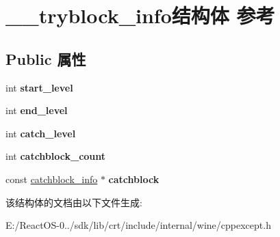\hypertarget{struct____tryblock__info}{}\section{\+\_\+\+\_\+tryblock\+\_\+info结构体 参考}
\label{struct____tryblock__info}
\subsection*{Public 属性}
\begin{DoxyCompactItemize}
\item 
\mbox{\label{struct____tryblock__info_a83c4d072d83211feb322e2071b5962cf}} 
int {\bfseries start\+\_\+level}
\item 
\mbox{\label{struct____tryblock__info_a9a10f00b8deae949d2c90fd0f63cc679}} 
int {\bfseries end\+\_\+level}
\item 
\mbox{\label{struct____tryblock__info_aeb014984d06e8577f6620a59be25ab47}} 
int {\bfseries catch\+\_\+level}
\item 
\mbox{\label{struct____tryblock__info_a8ea5d6d06fa9d10e2b70ebf8d7323572}} 
int {\bfseries catchblock\+\_\+count}
\item 
\mbox{\label{struct____tryblock__info_a980a4c2e5571539863a3f48ac8007cd3}} 
const \hyperlink{struct____catchblock__info}{catchblock\+\_\+info} $\ast$ {\bfseries catchblock}
\end{DoxyCompactItemize}


该结构体的文档由以下文件生成\+:\begin{DoxyCompactItemize}
\item 
E\+:/\+React\+O\+S-\/0../sdk/lib/crt/include/internal/wine/cppexcept.\+h\end{DoxyCompactItemize}
